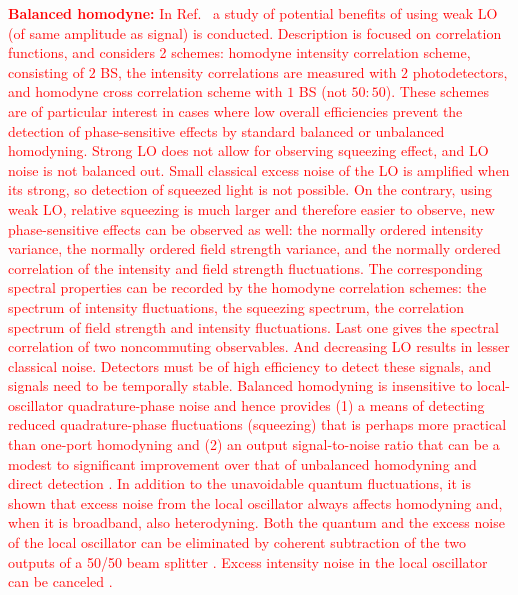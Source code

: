 \documentclass[%
reprint,
superscriptaddress,
 amsmath,amssymb,amsfonts,
 aps,
 pra,
 longbibliography
]{revtex4-2}
\begin{document}
\textcolor{red} {\textbf{Balanced homodyne:} In
  Ref.~\cite{PhysRevA.51.4160} a study of potential benefits of using
  weak LO (of same amplitude as signal) is conducted. Description is
  focused on correlation functions, and considers 2 schemes: homodyne
  intensity correlation scheme, consisting of $2$ BS, the intensity
  correlations are measured with $2$ photodetectors, and homodyne
  cross correlation scheme with $1$ BS (not $50:50$). These schemes
  are of particular interest in cases where low overall efficiencies
  prevent the detection of phase-sensitive effects by standard
  balanced or unbalanced homodyning. Strong LO does not allow for
  observing squeezing effect, and LO noise is not balanced out. Small
  classical excess noise of the LO is amplified when its strong, so
  detection of squeezed light is not possible. On the contrary, using
  weak LO, relative squeezing is much larger and therefore easier to
  observe, new phase-sensitive effects can be observed as well: the
  normally ordered intensity variance, the normally ordered field
  strength variance, and the normally ordered correlation of the
  intensity and field strength fluctuations. The corresponding
  spectral properties can be recorded by the homodyne correlation
  schemes: the spectrum of intensity fluctuations, the squeezing
  spectrum, the correlation spectrum of field strength and intensity
  fluctuations. Last one gives the spectral correlation of two
  noncommuting observables. And decreasing LO results in lesser
  classical noise. Detectors must be of high efficiency to detect
  these signals, and signals need to be temporally stable.  Balanced
  homodyning is insensitive to local-oscillator quadrature-phase noise
  and hence provides (1) a means of detecting reduced quadrature-phase
  fluctuations (squeezing) that is perhaps more practical than
  one-port homodyning and (2) an output signal-to-noise ratio that can
  be a modest to significant improvement over that of unbalanced
  homodyning and direct detection \cite{Schumaker:84}. In addition to
  the unavoidable quantum fluctuations, it is shown that excess noise
  from the local oscillator always affects homodyning and, when it is
  broadband, also heterodyning. Both the quantum and the excess noise
  of the local oscillator can be eliminated by coherent subtraction of
  the two outputs of a 50/50 beam splitter \cite{Yuen:83}. Excess
  intensity noise in the local oscillator can be canceled
  \cite{Abbas:83}.  }
        
\end{document}
